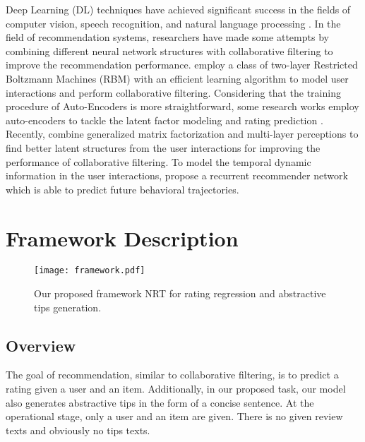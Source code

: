 \documentclass[sigconf]{acmart}
\begin{document}
Deep Learning (DL) techniques have achieved significant success in the fields of computer vision, speech recognition, and natural language processing  \cite{Goodfellow2016}. In the field of recommendation systems, researchers have made some attempts by combining different neural network structures with collaborative filtering to improve the recommendation performance.
\citet{salakhutdinov2007restricted} employ a class of two-layer Restricted Boltzmann Machines (RBM) with an efficient learning algorithm to model user interactions and perform collaborative filtering.
Considering that the training procedure of Auto-Encoders \cite{ng2011sparse} is more straightforward, some research works employ auto-encoders to tackle the latent factor modeling and rating prediction   \cite{sedhain2015autorec,wu2016collaborative,vincent2010stacked}.
Recently, \citet{he2017neural} combine generalized matrix factorization and multi-layer perceptions to find better latent structures from the user interactions for improving the performance of collaborative filtering.
To model the temporal dynamic information in the user interactions, \citet{wu10recurrent} propose a recurrent recommender network which is able to predict future behavioral trajectories.



\section{Framework Description}
\label{section3}

\begin{figure*}[!t]
	\centering
	\texttt{[image: framework.pdf]}
	\caption{\label{fig:framework}
		Our proposed framework NRT for rating regression and abstractive tips generation.
	}
	\vspace{0mm}
\end{figure*}

\subsection{Overview}
The goal of recommendation, similar to collaborative filtering, is to predict a rating given a user and an item.
Additionally, in our proposed task, our model also generates abstractive tips in the form of a concise sentence. At the operational stage, only a user and an item are given.
There is no given review texts and obviously no tips texts.
\end{document}
